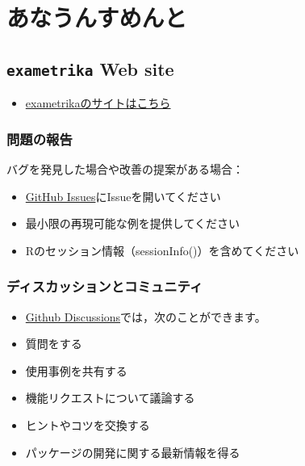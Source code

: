 \documentclass[
  a4paper,
]{ltjsbook}
\providecommand{\tightlist}{%
  \setlength{\itemsep}{0pt}\setlength{\parskip}{0pt}}\usepackage{longtable,booktabs,array}
\begin{document}
\section{あなうんすめんと}\label{ux3042ux306aux3046ux3093ux3059ux3081ux3093ux3068}

\subsection{\texorpdfstring{\texttt{exametrika} Web
site}{exametrika Web site}}\label{exametrika-web-site}

\begin{itemize}
\tightlist
\item
  \href{https://kosugitti.github.io/exametrika/}{exametrikaのサイトはこちら}
\end{itemize}

\subsubsection{問題の報告}\label{ux554fux984cux306eux5831ux544a}

バグを発見した場合や改善の提案がある場合：

\begin{itemize}
\tightlist
\item
  \href{https://github.com/kosugitti/exametrika/issues}{GitHub
  Issues}にIssueを開いてください
\item
  最小限の再現可能な例を提供してください
\item
  Rのセッション情報（sessionInfo()）を含めてください
\end{itemize}

\subsubsection{ディスカッションとコミュニティ}\label{ux30c7ux30a3ux30b9ux30abux30c3ux30b7ux30e7ux30f3ux3068ux30b3ux30dfux30e5ux30cbux30c6ux30a3}

\begin{itemize}
\item
  \href{https://github.com/kosugitti/exametrika/discussions}{Github
  Discussions}では，次のことができます。
\item
  質問をする
\item
  使用事例を共有する
\item
  機能リクエストについて議論する
\item
  ヒントやコツを交換する
\item
  パッケージの開発に関する最新情報を得る
\end{itemize}
\end{document}
